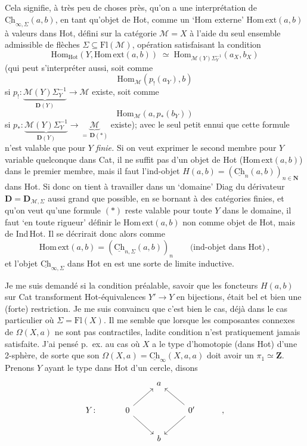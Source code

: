 \documentclass[11pt]{article}
\newcommand{\msp}[1]{\marginpar{\footnotesize [#1]}}
\newcommand{\Ch}{\underline{\mathrm{Ch}}}
\newcommand{\Hot}{\mathrm{Hot}}
\begin{document}
\msp{page 131}
Cela signifie, à très peu de choses près, qu'on a une interprétation de $\Ch_{\infty,\Sigma}(a,b)$, en tant qu'objet de Hot, comme un `Hom externe' $\mathrm{Hom\,ext}(a,b)$ à valeurs dans Hot, défini sur la catégorie $\mathcal{M}=X$ à l'aide du seul ensemble admissible de flèches $\Sigma\subseteq\mathrm{Fl}(\mathcal{M})$, opération satisfaisant la condition
\[ \boxed{\mathrm{Hom}_{\Hot}(Y,\mathrm{Hom\,ext}(a,b)) \;\simeq\; \mathrm{Hom}_{\mathcal{M}(Y)\Sigma_Y^{-1}}(a_X,b_X)} \tag*{$(*)$} \]
(qui peut s'interpréter aussi, soit comme
\[ \mathrm{Hom}_{\mathcal{M}}(p_!(a_Y),b) \]
si $p_! : \underbrace{\mathcal{M}(Y)\Sigma_Y^{-1}}_{\mathbf{D}(Y)} \longrightarrow \mathcal{M}$ existe, soit comme
\[ \mathrm{Hom}_{\mathcal{M}}(a,p_*(b_Y)) \]
si $p_* : \underbrace{\mathcal{M}(Y)\Sigma_Y^{-1}}_{\mathbf{D}(Y)} \longrightarrow \underbrace{\mathcal{M}}_{=\,\mathbf{D}(*)}$ existe); avec le seul petit ennui que cette formule n'est valable que pour $Y$ \textit{finie.} Si on veut exprimer le second membre pour $Y$ variable quelconque dans Cat, il ne suffit pas d'un objet de Hot ($\mathrm{Hom\,ext}(a,b)$) dans le premier membre, mais il faut l'ind-objet $H(a,b) = (\Ch_n(a,b))_{n\in\mathbf{N}}$ dans Hot. Si donc on tient à travailler dans un `domaine' Diag du dérivateur $\mathbf{D}=\mathbf{D}_{\mathcal{M},\Sigma}$ aussi grand que possible, en se bornant à des catégories finies,
\msp{page 132}
et qu'on veut qu'une formule $(*)$ reste valable pour toute $Y$ dans le domaine, il faut `en toute rigueur' définir le $\mathrm{Hom\,ext}(a,b)$ non comme objet de Hot, mais de Ind\,Hot. Il se décrirait donc alors comme
\[ \mathrm{Hom\,ext}(a,b) = (\Ch_{n,\Sigma}(a,b))_n \qquad \text{(ind-objet dans Hot)}\ , \]
et l'objet $\Ch_{\infty,\Sigma}$ dans Hot en est une sorte de limite inductive.

Je me suis demandé si la condition préalable, savoir que les foncteurs $H(a,b)$ sur Cat transforment Hot-équivalences $Y'\longrightarrow Y$ en bijections, était bel et bien une (forte) restriction. Je me suis convaincu que c'est bien le cas, déjà dans le cas particulier où $\Sigma=\mathrm{Fl}(X)$. Il me semble que lorsque les composantes connexes de $\Omega(X,a)$ ne sont pas contractiles, ladite condition n'est pratiquement jamais satisfaite. J'ai pensé p.~ex. au cas où $X$ a le type d'homotopie (dans Hot) d'une 2-sphère, de sorte que son $\Omega(X,a)=\Ch_\infty(X,a,a)$ doit avoir un $\pi_1\simeq\mathbf{Z}$. Prenons $Y$ ayant le type dans Hot d'un cercle, disons
\[
\begin{tikzcd}
 & & a & & \\
Y\colon & 0 \arrow[ur] \arrow[dr] & & 0' \arrow[ul] \arrow[dl] & , \\
 & & b & &
\end{tikzcd}
\]
\end{document}
